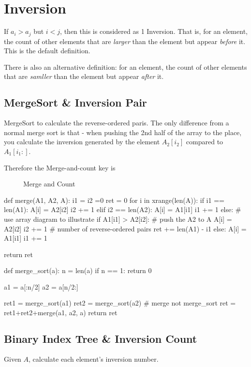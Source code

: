 \section{Inversion}
If $a_i > a_j$ but $i<j$, then this is considered as 1 Inversion. That is, for an element, the count of other elements that are \textit{larger} than the element but appear \textit{before} it. This is the default definition. 

There is also an alternative definition: for an element, the count of other elements that are \textit{samller} than the element but appear \textit{after} it. 

\subsection{MergeSort \& Inversion Pair}
MergeSort to calculate the reverse-ordered paris. The only difference from a normal
merge sort is that - when pushing the 2nd half of the array to the place, you calculate
the inversion generated by the element $A_2[i_2]$ compared to $A_1[i_1:]$.

Therefore the Merge-and-count key is 

\begin{figure}[hbtp]
\centering
{}
\caption{Merge and Count}
\label{fig:mergeAndSort}
\end{figure}

\begin{python}
def merge(A1, A2, A):
  i1 = i2 =0
  ret = 0
  for i in xrange(len(A)):
    if i1 == len(A1):
      A[i] = A2[i2]
      i2 += 1
    elif i2 == len(A2):
      A[i] = A1[i1]
      i1 += 1
    else:
      # use array diagram to illustrate
      if A1[i1] > A2[i2]:  # push the A2 to A
        A[i] = A2[i2]
        i2 += 1
        # number of reverse-ordered pairs
        ret += len(A1) - i1
      else:
        A[i] = A1[i1]
        i1 += 1

  return ret

def merge_sort(a):
  n = len(a)
  if n == 1:
    return 0

  a1 = a[:n/2]
  a2 = a[n/2:]

  ret1 = merge_sort(a1)
  ret2 = merge_sort(a2)
  # merge not merge_sort
  ret = ret1+ret2+merge(a1, a2, a)  
  return ret
\end{python}

\subsection{Binary Index Tree \& Inversion Count}
Given $A$, calculate each element's inversion number. 

